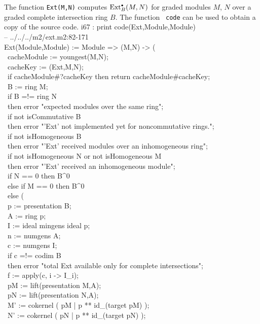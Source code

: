 \begin{code}
\label{master}
The function {\tt Ext(M,N)} computes $\operatorname{Ext}_B^{\scriptscriptstyle\bullet}(M,N)$ for graded modules
$M$, $N$ over a graded complete intersection ring $B$.  The function {\tt
  code} can be used to obtain a copy of the source code.
\beginOutput
i67 : print code(Ext,Module,Module)\\
-- ../../../m2/ext.m2:82-171\\
Ext(Module,Module) := Module => (M,N) -> (\\
\  cacheModule := youngest(M,N);\\
\  cacheKey := (Ext,M,N);\\
\  if cacheModule#?cacheKey then return cacheModule#cacheKey;\\
\  B := ring M;\\
\  if B =!= ring N\\
\  then error "expected modules over the same ring";\\
\  if not isCommutative B\\
\  then error "'Ext' not implemented yet for noncommutative rings.";\\
\  if not isHomogeneous B\\
\  then error "'Ext' received modules over an inhomogeneous ring";\\
\  if not isHomogeneous N or not isHomogeneous M\\
\  then error "'Ext' received an inhomogeneous module";\\
\  if N == 0 then B^0\\
\  else if M == 0 then B^0\\
\  else (\\
\    p := presentation B;\\
\    A := ring p;\\
\    I := ideal mingens ideal p;\\
\    n := numgens A;\\
\    c := numgens I;\\
\    if c =!= codim B \\
\    then error "total Ext available only for complete intersections";\\
\    f := apply(c, i -> I_i);\\
\    pM := lift(presentation M,A);\\
\    pN := lift(presentation N,A);\\
\    M' := cokernel ( pM | p ** id_(target pM) );\\
\    N' := cokernel ( pN | p ** id_(target pN) );\\

\end{code}
